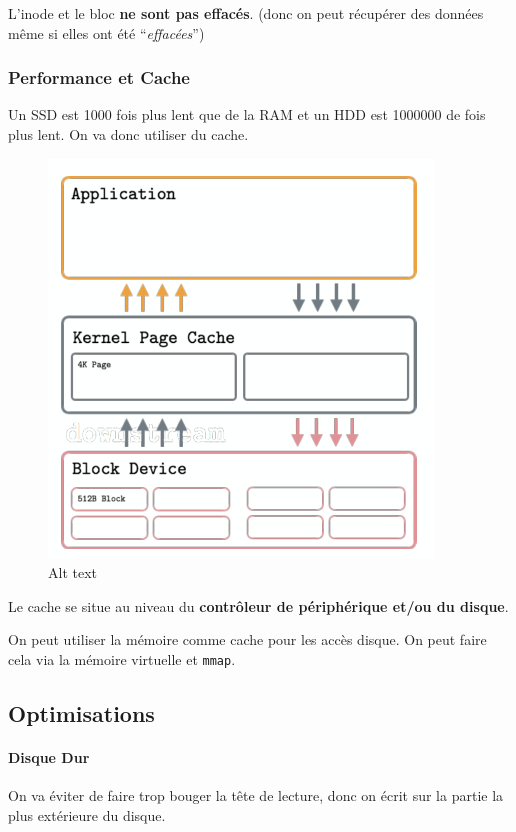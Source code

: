 L'inode et le bloc \textbf{ne sont pas effacés}. (donc on peut récupérer
des données même si elles ont été ``\emph{effacées}'')

\subsubsection{Performance et Cache}\label{performance-et-cache}

Un SSD est 1000 fois plus lent que de la RAM et un HDD est 1000000 de
fois plus lent. On va donc utiliser du cache.

\begin{figure}
\centering
\includegraphics{image-46.png}
\caption{Alt text}
\end{figure}

Le cache se situe au niveau du \textbf{contrôleur de périphérique et/ou
du disque}.

On peut utiliser la mémoire comme cache pour les accès disque. On peut
faire cela via la mémoire virtuelle et \texttt{mmap}.

\subsection{Optimisations}\label{optimisations}

\paragraph{Disque Dur}\label{disque-dur}

On va éviter de faire trop bouger la tête de lecture, donc on écrit sur
la partie la plus extérieure du disque.

